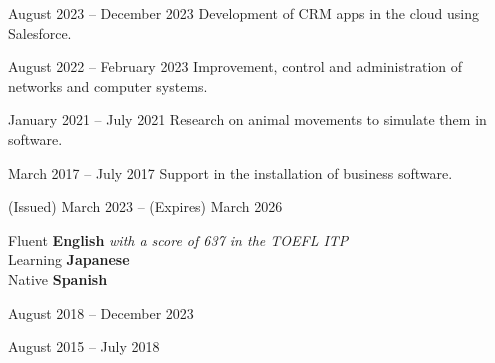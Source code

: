 \documentclass[a4paper,11pt]{memoir} %
\begin{document}
\userinformation %

\framebreak %


\heading{\fullname} %



\Sep


{August 2023 -- December 2023}
{Development of CRM apps in the cloud using Salesforce.}

{August 2022 -- February 2023}
{Improvement, control and administration of networks and computer systems.}

{January 2021 -- July 2021}
{Research on animal movements to simulate them in software.}

{March 2017 -- July 2017}
{Support in the installation of business software.}

\Sep


{(Issued) March 2023 -- (Expires) March 2026}{}

\Sep


\techtable

\Sep


\bluebullet Fluent \textbf{English} \textit{with a score of 637 in the TOEFL ITP} \\
\bluebullet Learning \textbf{Japanese} \\
\bluebullet Native \textbf{Spanish} \\


{August 2018 -- December 2023}{}

{August 2015 -- July 2018}{}

\end{document}
